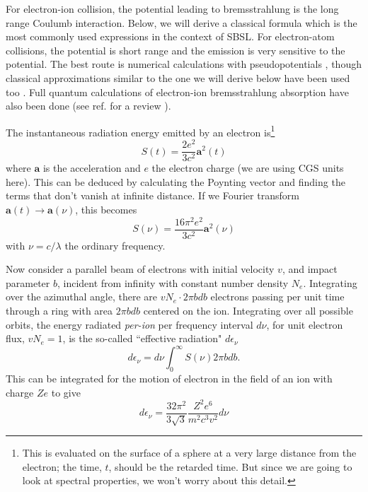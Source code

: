 \documentclass[prb,aps,nofootinbib,superscriptaddress,floatfix]{revtex4-2}
\begin{document}
For electron-ion collision, the potential leading to bremsstrahlung is the long range Coulumb interaction. Below, we will derive a classical formula which is the most commonly used expressions in the context of SBSL. For electron-atom collisions, the potential is short range and the emission is very sensitive to the potential. The best route is numerical calculations with pseudopotentials \cite{geltman1973free}, though classical approximations similar to the one we will derive below have been used too \cite{hilgenfeldt1999simple,hilgenfeldt1999sonoluminescence,zel2002physics}. Full quantum calculations of electron-ion bremsstrahlung absorption have also been done (see ref. for a review \cite{eckert2015aether}).

The instantaneous radiation energy emitted by an electron is\footnote{This is evaluated on the surface of a sphere at a very large distance from the electron; the time, $t$, should be the retarded time. But since we are going to look at spectral properties, we won't worry about this detail.} \cite{zel2002physics,griffiths2005introduction}
\begin{equation}
    S(t)=\frac{2e^2}{3c^2}\bm{a}^2(t)
\end{equation}
where $\bm{a}$ is the acceleration and $e$ the electron charge (we are using CGS units here). This can be deduced by calculating the Poynting vector and finding the terms that don't vanish at infinite distance. If we Fourier transform $\bm{a}(t) \rightarrow \bm{a}(\nu)$, this becomes
\begin{equation}
    S(\nu)=\frac{16 \pi^2 e^2}{3c^2}\bm{a}^2(\nu)
\end{equation}
with $\nu=c/\lambda$ the ordinary frequency.

Now consider a parallel beam of electrons with initial velocity $v$, and impact parameter $b$, incident from infinity with constant number density $N_e$. Integrating over the azimuthal angle, there are $v N_e \cdot  2\pi b db$ electrons passing per unit time through a ring with area $2\pi b db$ centered on the ion. Integrating over all possible orbits, the energy radiated \emph{per-ion} per frequency interval $d\nu$, for unit electron flux, $v N_e=1$, is the so-called ``effective radiation" $d\epsilon_\nu$ \cite{zel2002physics} 
\begin{equation}
    d\epsilon_\nu = d\nu \int_0^\infty S(\nu) 2 \pi b db.
    \label{eq:effective_radiation}
\end{equation}
This can be integrated for the motion of electron in the field of an ion with charge $Ze$ to give \cite{zel2002physics,landau2013classical}
\begin{equation}
    d\epsilon_\nu = \frac{32 \pi^2 }{3 \sqrt{3}} \frac{Z^2e^6}{m^2 c^3 v^2} d\nu
    \label{eq:effective_radiation_2}
\end{equation}
\end{document}
